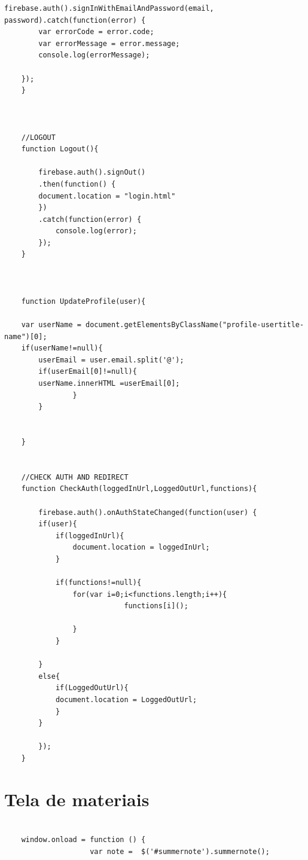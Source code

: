 \documentclass[
	12pt,				%
	openright,			%
	twoside,			%
	a4paper,			%
	english,			%
	french,				%
	spanish,			%
	brazil				%
	]{abntex2}
\begin{document}
\begin{apendicesenv}
\begin{lstlisting}[numbers=none,
basicstyle=\small,
caption={Auth.js},
title={Auth.js},
label={Auth.js}]
        firebase.auth().signInWithEmailAndPassword(email, password).catch(function(error) {  
        var errorCode = error.code;
        var errorMessage = error.message;  
        console.log(errorMessage);
    
    });
    }
    
    
    
    //LOGOUT 
    function Logout(){
    
        firebase.auth().signOut()
        .then(function() {
        document.location = "login.html"
        })
        .catch(function(error) {
            console.log(error);
        });
    }
    
    
    
    function UpdateProfile(user){	
    
    var userName = document.getElementsByClassName("profile-usertitle-name")[0];
    if(userName!=null){
        userEmail = user.email.split('@');
        if(userEmail[0]!=null){
        userName.innerHTML =userEmail[0];
                }
        }
        
        
    }
    
    
    //CHECK AUTH AND REDIRECT
    function CheckAuth(loggedInUrl,LoggedOutUrl,functions){
    
        firebase.auth().onAuthStateChanged(function(user) {
        if(user){
            if(loggedInUrl){   		 
                document.location = loggedInUrl;  
            } 
    
            if(functions!=null){
                for(var i=0;i<functions.length;i++){
                            functions[i]();
                        
                }
            }
            
        }
        else{
            if(LoggedOutUrl){
            document.location = LoggedOutUrl; 
            } 
        }
    
        });
    }

\end{lstlisting}

\section{Tela de materiais} \label{cod_material}
\begin{lstlisting}[numbers=none,
basicstyle=\small,
caption={Material.js},
title={Material.js},
label={Material.js}]

    window.onload = function () {                    
                    var note =  $('#summernote').summernote();    


\end{lstlisting}
\end{apendicesenv}
\end{document}
